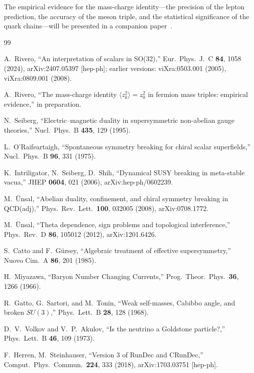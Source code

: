 \documentclass[12pt,a4paper]{article}
\begin{document}
The empirical evidence for the mass-charge identity---the
precision of the lepton prediction, the accuracy of the meson
triple, and the statistical significance of the quark
chains---will be presented in a companion paper~\cite{companion}.


\begin{thebibliography}{99}

A.~Rivero, ``An interpretation of scalars in SO(32),''
Eur.\ Phys.\ J.\ C \textbf{84}, 1058 (2024),
arXiv:2407.05397 [hep-ph]; earlier versions: viXra:0503.001 (2005),
viXra:0809.001 (2008).

A.~Rivero, ``The mass-charge identity
$\langle z_k^2\rangle = z_0^2$ in fermion mass triples:
empirical evidence,'' in preparation.

N.~Seiberg, ``Electric--magnetic duality in supersymmetric
non-abelian gauge theories,'' Nucl.\ Phys.\ B \textbf{435}, 129
(1995).

L.~O'Raifeartaigh, ``Spontaneous symmetry breaking for chiral
scalar superfields,'' Nucl.\ Phys.\ B \textbf{96}, 331 (1975).

K.~Intriligator, N.~Seiberg, D.~Shih, ``Dynamical SUSY breaking
in meta-stable vacua,'' JHEP \textbf{0604}, 021 (2006),
arXiv:hep-ph/0602239.

M.~\"Unsal, ``Abelian duality, confinement, and chiral symmetry
breaking in QCD(adj),'' Phys.\ Rev.\ Lett.\ \textbf{100}, 032005
(2008), arXiv:0708.1772.

M.~\"Unsal, ``Theta dependence, sign problems and topological
interference,'' Phys.\ Rev.\ D \textbf{86}, 105012 (2012),
arXiv:1201.6426.

S.~Catto and F.~G\"ursey, ``Algebraic treatment of effective
supersymmetry,'' Nuovo Cim.\ A \textbf{86}, 201 (1985).

H.~Miyazawa, ``Baryon Number Changing Currents,''
Prog.\ Theor.\ Phys.\ \textbf{36}, 1266 (1966).

R.~Gatto, G.~Sartori, and M.~Tonin, ``Weak self-masses, Cabibbo
angle, and broken $SU(3)$,'' Phys.\ Lett.\ B \textbf{28}, 128 (1968).

D.~V.~Volkov and V.~P.~Akulov, ``Is the neutrino a Goldstone
particle?,'' Phys.\ Lett.\ B \textbf{46}, 109 (1973).

F.~Herren, M.~Steinhauser, ``Version 3 of RunDec and CRunDec,''
Comput.\ Phys.\ Commun.\ \textbf{224}, 333 (2018),
arXiv:1703.03751 [hep-ph].


\end{thebibliography}
\end{document}
